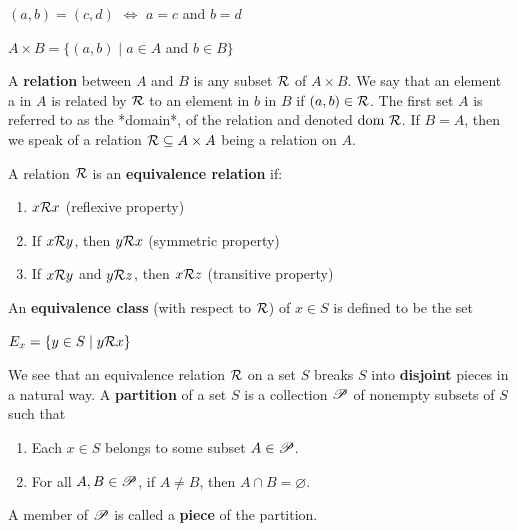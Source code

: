 \documentclass[12pt]{article}
\begin{document}
\begin{theorem}
  $(a, b) = (c, d)$ $\iff$ $a = c$ and $b = d$
\end{theorem}

\begin{definition}
  $A \times B = \{(a,b) \mid a \in A$ and $b \in B\}$
\end{definition}

\begin{definition}[Relation]
  A \textbf{relation} between $A$ and $B$ is any subset $\mathcal{R}$ of $A \times B$. We say
  that an element a in $A$ is related by $\mathcal{R}$ to an element in $b$ in $B$ if
  $(a, b) \in \mathcal{R}$. The first set $A$ is referred to as the *domain*, of the
  relation and denoted $\text{dom }\mathcal{R}$. If $B=A$, then we speak of a relation $\mathcal{R} \subseteq A
  \times A$ being a relation on $A$.
\end{definition}

\begin{definition}
  A relation $\mathcal{R}$ is an \textbf{equivalence relation} if:
  \begin{enumerate}
  \item $x \mathcal{R} x$ \hfill (reflexive property)
  \item If $x \mathcal{R} y$, then $y \mathcal{R} x$ \hfill (symmetric property)
  \item If $x \mathcal{R} y$ and $y \mathcal{R} z$, then $x \mathcal{R} z$ \hfill (transitive property)
  \end{enumerate}

  An \textbf{equivalence class} (with respect to $\mathcal{R}$) of $x \in S$ is defined to
  be the set
  \begin{center}
    $E_{x} = \{y \in S \mid y \mathcal{R} x\}$
  \end{center}
\end{definition}

\begin{definition}[Partition]
We  see that  an equivalence  relation  $\mathcal{R}$ on  a  set $S$  breaks $S$  into
\textbf{disjoint} pieces in a natural way.  A \textbf{partition} of a set $S$
is a collection $\mathscr{P}$ of nonempty subsets of $S$ such that
\begin{enumerate}
  \item Each $x \in S$ belongs to some subset $A \in \mathscr{P}$.
  \item For all $A, B \in \mathscr{P}$, if $A \ne B$, then $A \cap B = \varnothing$.
\end{enumerate}
A member of $\mathscr{P}$ is called a \textbf{piece} of the partition.
\end{definition}
\end{document}
